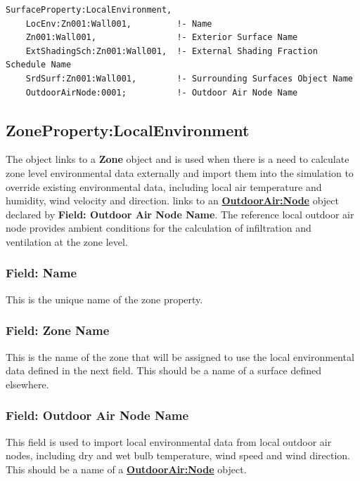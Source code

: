 \begin{lstlisting}
SurfaceProperty:LocalEnvironment,
    LocEnv:Zn001:Wall001,         !- Name
    Zn001:Wall001,                !- Exterior Surface Name
    ExtShadingSch:Zn001:Wall001,  !- External Shading Fraction Schedule Name
    SrdSurf:Zn001:Wall001,        !- Surrounding Surfaces Object Name
    OutdoorAirNode:0001;          !- Outdoor Air Node Name
\end{lstlisting}

\subsection{ZoneProperty:LocalEnvironment}\label{ZonePropertylocalEnvironment}

The object links to a \textbf{Zone} object and is used when there is a need to calculate zone level environmental data externally and import them into the simulation to override existing environmental data, including local air temperature and humidity, wind velocity and direction. links to an \textbf{\hyperref[outdoorairnode]{OutdoorAir:Node}} object declared by \textbf{Field: Outdoor Air Node Name}. The reference local outdoor air node provides ambient conditions for the calculation of infiltration and ventilation at the zone level.

\subsubsection{Field: Name}\label{field-zone-localenv-name}

This is the unique name of the zone property.

\subsubsection{Field: Zone Name}\label{ZonePropertylocalEnvironment-field-zone-name}

This is the name of the zone that will be assigned to use the local environmental data defined in the next field. This should be a name of a surface defined elsewhere.

\subsubsection{Field: Outdoor Air Node Name}\label{field-zone-outdoor-air-node-name}

This field is used to import local environmental data from local outdoor air nodes, including dry and wet bulb temperature, wind speed and wind direction. This should be a name of a \textbf{\hyperref[outdoorairnode]{OutdoorAir:Node}} object.


